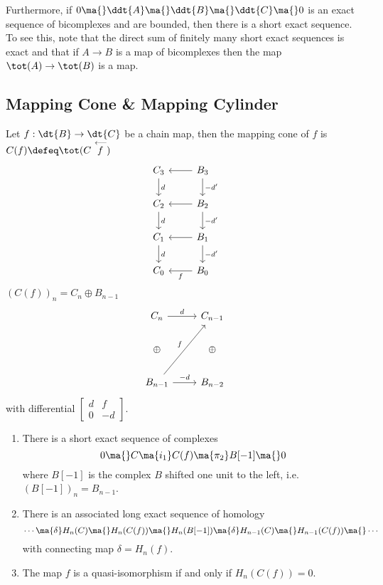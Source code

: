 Furthermore, if $0 \ma{} \ddt{A} \ma{} \ddt{B} \ma{} \ddt{C} \ma{} 0$ is an exact sequence of bicomplexes and are bounded, then there is a short exact sequence. To see this, note that the direct sum of finitely many short exact sequences is exact and that if $A \to B$ is a map of bicomplexes then the map $\tot(A) \to \tot(B)$ is a map. 

\subsection{Mapping Cone \& Mapping Cylinder}

\begin{dfn}
Let $f: \dt{B} \to \dt{C}$ be a chain map, then the mapping cone of $f$ is $C(f) \defeq \tot(C \stackrel{\longleftarrow}{f})$
\[
\begin{tikzcd}
C_3 \arrow{d}{d} & B_3 \arrow{l} \arrow{d}{-d'} \\
C_2 \arrow{d}{d} & B_2 \arrow{l} \arrow{d}{-d'} \\
C_1 \arrow{d}{d} & B_1 \arrow{l} \arrow{d}{-d'} \\
C_0 & B_0 \arrow{l}{f}
\end{tikzcd}
\]
$\left(C(f)\right)_n=C_n \oplus B_{n-1}$
\[
\begin{tikzcd}
C_n \arrow{r}{d} & C_{n-1} \\
\oplus & \oplus \\
B_{n-1} \arrow{uur}{f} \arrow{r}{-d} & B_{n-2}
\end{tikzcd}
\]
with differential $\begin{bmatrix} d & f \\ 0 & -d \end{bmatrix}$. 
\end{dfn}

\begin{prop}
\begin{enumerate}[1.]
\item There is a short exact sequence of complexes
\[
0 \ma{} C \ma{i_1} C(f) \ma{\pi_2} B[-1] \ma{} 0 
\]
where $B[-1]$ is the complex $B$ shifted one unit to the left, i.e. $(B[-1])_n=B_{n-1}$. 
\item There is an associated long exact sequence of homology
\[
\cdots \ma{\delta} H_n(C) \ma{} H_n(C(f)) \ma{} H_n(B[-1]) \ma{\delta} H_{n-1}(C) \ma{} H_{n-1}(C(f)) \ma{} \cdots
\]
with connecting map $\delta=H_n(f)$. 
\item The map $f$ is a quasi-isomorphism if and only if $H_n(C(f))=0$. 
\end{enumerate}
\end{prop}


